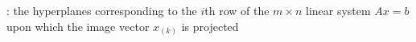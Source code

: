 \begin{tcbenvironment}
\begin{tcbparbox}
\begin{itemize}
             : the hyperplanes corresponding to the $i$th row of the $m\times n$ linear system $Ax=b$ upon which the image vector $x_{(k)}$ is projected
    \end{itemize}
\end{tcbparbox}
\end{tcbenvironment}
\endinput
